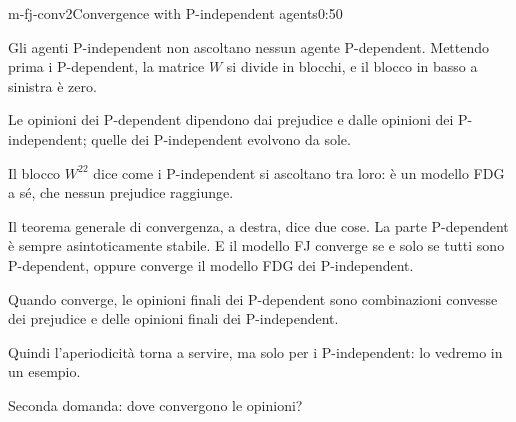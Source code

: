 \begin{slide}{m-fj-conv2}{Convergence with P-independent agents\nuova}{0:50}
  \begin{discorso}
    \item {\color{blue}Gli agenti P-independent non ascoltano nessun agente P-dependent. Mettendo prima i P-dependent, la matrice $W$ si divide in blocchi, e il blocco in basso a sinistra è zero.}
    \item {\color{blue}Le opinioni dei P-dependent dipendono dai prejudice e dalle opinioni dei P-independent; quelle dei P-independent evolvono da sole.}
    \item {\color{blue}Il blocco $W^{22}$ dice come i P-independent si ascoltano tra loro: è un modello FDG a sé, che nessun prejudice raggiunge.}
    \item {\color{blue}Il teorema generale di convergenza, a destra, dice due cose. La parte P-dependent è sempre asintoticamente stabile. E il modello FJ converge se e solo se tutti sono P-dependent, oppure converge il modello FDG dei P-independent.}
    \item {\color{blue}Quando converge, le opinioni finali dei P-dependent sono combinazioni convesse dei prejudice e delle opinioni finali dei P-independent.}
    \item {\color{blue}Quindi l'aperiodicità torna a servire, ma solo per i P-independent: lo vedremo in un esempio.}
    \item {\color{blue}Seconda domanda: dove convergono le opinioni?}
  \end{discorso}
\end{slide}

